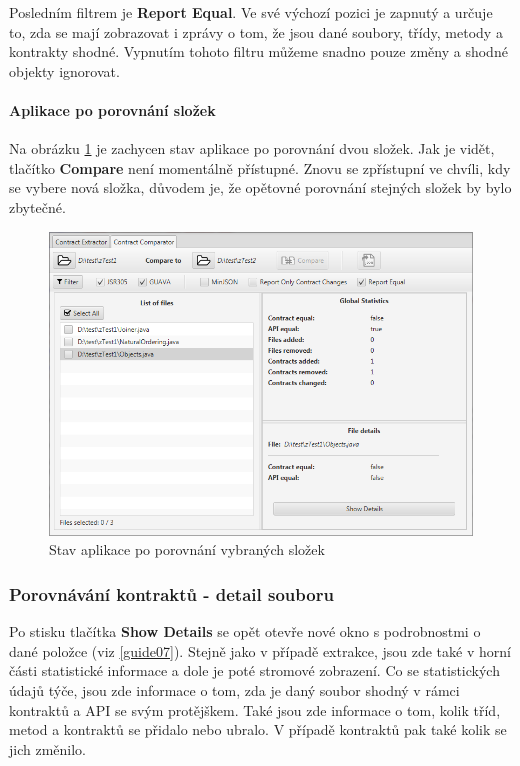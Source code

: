 			Posledním filtrem je \textbf{Report Equal}. Ve své výchozí pozici je zapnutý a určuje to, zda se mají zobrazovat i zprávy o tom, že jsou dané soubory, třídy, metody a kontrakty shodné. Vypnutím tohoto filtru můžeme snadno pouze změny a shodné objekty ignorovat.\\
		
		\paragraph{Aplikace po porovnání složek}	
			Na obrázku \ref{guide08} je zachycen stav aplikace po porovnání dvou složek. Jak je vidět, tlačítko \textbf{Compare} není momentálně přístupné. Znovu se zpřístupní ve chvíli, kdy se vybere nová složka, důvodem je, že opětovné porovnání stejných složek by bylo zbytečné.
			
			\begin{figure}[!htb]
					\centering
					\includegraphics[width=1\textwidth]{img/guide08.png}
					\caption[guide08]{Stav aplikace po porovnání vybraných složek}
					\label{guide08}
				\endminipage\hfill
			\end{figure}			
			
	\subsubsection{Porovnávání kontraktů - detail souboru}
		Po stisku tlačítka \textbf{Show Details} se opět otevře nové okno s podrobnostmi o dané položce (viz \ref{guide07}). Stejně jako v případě extrakce, jsou zde také v horní části statistické informace a dole je poté stromové zobrazení. Co se statistických údajů týče, jsou zde informace o tom, zda je daný soubor shodný v rámci kontraktů a API se svým protějškem. Také jsou zde informace o tom, kolik tříd, metod a kontraktů se přidalo nebo ubralo. V případě kontraktů pak také kolik se jich změnilo.\\
		
